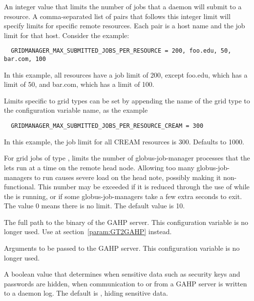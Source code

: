 \begin{description}
\label{param:GridmanagerMaxSubmittedJobsPerResource}
\item[\Macro{GRIDMANAGER\_MAX\_SUBMITTED\_JOBS\_PER\_RESOURCE}]
  An integer value that limits the number of jobs
  that a  daemon will submit to a resource.
  A comma-separated list of pairs that follows this integer limit
  will specify limits for specific remote resources.
  Each pair is a host name and the job limit for that host.
  Consider the example:
  \footnotesize
  \begin{verbatim}
  GRIDMANAGER_MAX_SUBMITTED_JOBS_PER_RESOURCE = 200, foo.edu, 50, bar.com, 100
  \end{verbatim}
  \normalsize
  In this example, all resources have a job limit of 200, except foo.edu,
  which has a limit of 50, and bar.com, which has a limit of 100.

  Limits specific to grid types can be set by appending the
  name of the grid type to the configuration variable name, as the example
  \begin{verbatim}
  GRIDMANAGER_MAX_SUBMITTED_JOBS_PER_RESOURCE_CREAM = 300
  \end{verbatim}
  In this example, the job limit for all CREAM resources is 300.
  Defaults to 1000.

\label{param:GridmanagerMaxJobmanagersPerResource}
\item[\Macro{GRIDMANAGER\_MAX\_JOBMANAGERS\_PER\_RESOURCE}]
  For grid jobs of type , limits the number of globus-job-manager
  processes that the  lets run at a time on
  the remote head node. Allowing too many globus-job-managers to run
  causes severe load on the head note, possibly making it
  non-functional.
  This number may be exceeded if it is reduced through the use
  of  while the  is running,
  or if some globus-job-managers take a few extra seconds to exit.
  The value 0 means there is no limit. The default value is 10.

\label{param:Gahp}
\item[\Macro{GAHP}]
  The full path to the binary of the GAHP server.
  This configuration variable is no longer used.
  Use  at section~\ref{param:GT2GAHP} instead.

\label{param:GahpArgs}
\item[\Macro{GAHP\_ARGS}]
  Arguments to be passed to the GAHP server.
  This configuration variable is no longer used.

\label{param:GahpDebugHideSensitiveData}
\item[\Macro{GAHP\_DEBUG\_HIDE\_SENSITIVE\_DATA}]
  A boolean value that determines when 
  sensitive data such as security keys and passwords are hidden,
  when communication to or from a GAHP server 
  is written to a daemon log.
  The default is , hiding sensitive data.


\end{description}
